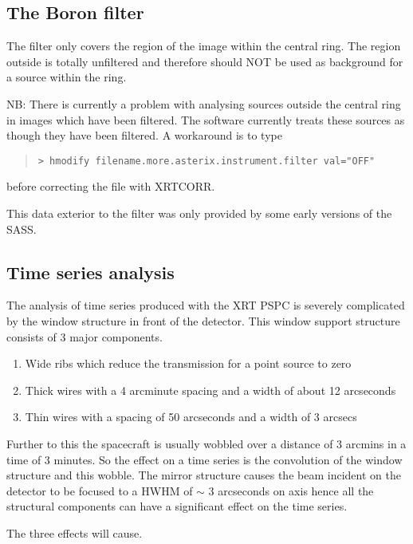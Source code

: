 \documentclass{book}
\renewcommand{\_}{{\tt\char'137}}     %
\begin{document}
\subsection{The Boron filter}
The filter only covers the region of the image within the central ring.
The region outside is totally unfiltered and therefore
should NOT be used as background for a source within the ring.

NB: There is currently a problem with analysing sources outside
the central ring in images which have been filtered. The software
currently treats these sources as though they have been filtered.
A workaround is to type
\begin{quote}\begin{verbatim}
> hmodify filename.more.asterix.instrument.filter val="OFF"
\end{verbatim}\end{quote}
before correcting the file with XRTCORR.

This data exterior to the filter was only provided by some early versions of
the SASS.

\subsection{Time series analysis}
The analysis of time series produced with the XRT PSPC is severely
complicated by the window structure in front of the detector.
This window support structure consists of 3 major components.

\begin{enumerate}
\item Wide ribs which reduce the transmission for a point source to zero
\item Thick wires with a 4 arcminute spacing and a width of about 12
arcseconds
\item Thin wires with a spacing of 50 arcseconds and a width of 3 arcsecs
\end{enumerate}
Further to this the spacecraft is usually wobbled over a distance of 3
arcmins in a time of 3 minutes. So the effect on a time series is the
convolution of the window structure and this wobble. The mirror structure
causes the beam incident on the detector to be focused to a HWHM of $\sim$ 3
arcseconds on axis hence all the structural components can have a
significant effect on the time series.

The three effects will cause.
\end{document}
